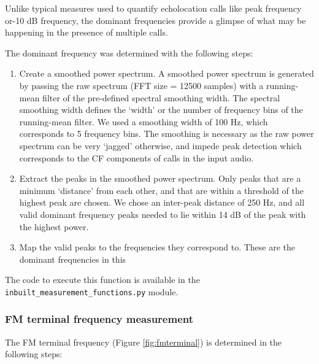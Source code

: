 \documentclass[
]{book}
\providecommand{\tightlist}{%
  \setlength{\itemsep}{0pt}\setlength{\parskip}{0pt}}
\begin{document}
Unlike typical measures used to quantify echolocation calls like peak frequency or-10 dB frequency, the dominant frequencies provide a glimpse of what may be happening in the presence of multiple calls.

The dominant frequency was determined with the following steps:

\begin{enumerate}
\def\labelenumi{\arabic{enumi}.}
\tightlist
\item
  Create a smoothed power spectrum. A smoothed power spectrum is generated by passing the raw spectrum (FFT size = 12500 samples) with a running-mean filter of the pre-defined spectral smoothing width. The spectral smoothing width defines the `width' or the number of frequency bins of the running-mean filter. We used a smoothing width of 100 Hz, which corresponds to 5 frequency bins. The smoothing is necessary as the raw power spectrum can be very `jagged' otherwise, and impede peak detection which corresponds to the CF components of calls in the input audio.
\item
  Extract the peaks in the smoothed power spectrum. Only peaks that are a minimum `distance' from each other, and that are within a threshold of the highest peak are chosen. We chose an inter-peak distance of 250 Hz, and all valid dominant frequency peaks needed to lie within 14 dB of the peak with the highest power.
\item
  Map the valid peaks to the frequencies they correspond to. These are the dominant frequencies in this
\end{enumerate}

The code to execute this function is available in the \texttt{inbuilt\_measurement\_functions.py} module.

\hypertarget{lowestfreqdetails}{%
\subsubsection{FM terminal frequency measurement}\label{lowestfreqdetails}}

The FM terminal frequency (Figure \ref{fig:fmterminal}) is determined in the following steps:
\end{document}
